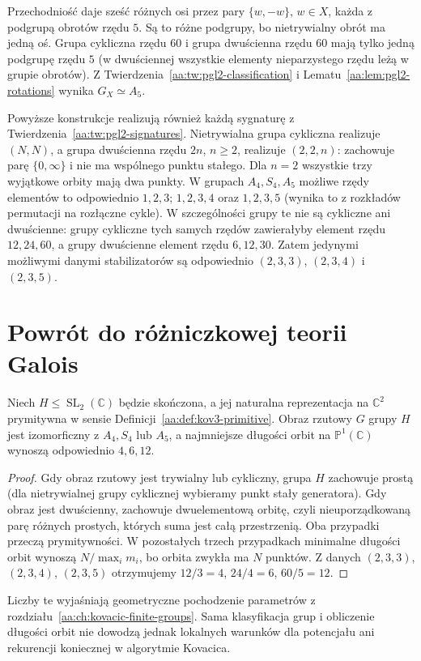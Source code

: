 \begin{przyklad}[Dwudziestościan]
Przechodniość daje sześć różnych osi przez pary
$\{w,-w\}$, $w\in X$, każda z podgrupą obrotów rzędu $5$.
Są to różne podgrupy, bo nietrywialny obrót ma jedną oś.
Grupa cykliczna rzędu $60$ i grupa dwuścienna rzędu $60$
mają tylko jedną podgrupę rzędu $5$ (w dwuściennej
wszystkie elementy nieparzystego rzędu leżą w grupie
obrotów). Z Twierdzenia~\ref{aa:tw:pgl2-classification}
i Lematu~\ref{aa:lem:pgl2-rotations} wynika $G_X\simeq A_5$.
\end{przyklad}

\begin{uwaga}
\label{aa:uw:pgl2-signatures-realized}
Powyższe konstrukcje realizują również każdą sygnaturę
z Twierdzenia~\ref{aa:tw:pgl2-signatures}.
Nietrywialna grupa cykliczna realizuje $(N,N)$,
a grupa dwuścienna rzędu $2n$, $n\ge2$, realizuje
$(2,2,n)$: zachowuje parę $\{0,\infty\}$ i nie ma
wspólnego punktu stałego. Dla $n=2$ wszystkie trzy
wyjątkowe orbity mają dwa punkty.
W grupach $A_4,S_4,A_5$ możliwe rzędy elementów
to odpowiednio $1,2,3$; $1,2,3,4$ oraz $1,2,3,5$
(wynika to z rozkładów permutacji na rozłączne cykle).
W szczególności grupy te nie są cykliczne ani dwuścienne:
grupy cykliczne tych samych rzędów zawierałyby element
rzędu $12,24,60$, a grupy dwuścienne element rzędu
$6,12,30$. Zatem jedynymi możliwymi danymi stabilizatorów
są odpowiednio $(2,3,3)$, $(2,3,4)$ i $(2,3,5)$.
\end{uwaga}

\section{Powrót do różniczkowej teorii Galois}

\begin{wniosek}
\label{aa:wn:pgl2-primitive-orbits}
Niech $H\le\operatorname{SL}_2(\mathbb C)$ będzie skończona,
a jej naturalna reprezentacja na $\mathbb C^2$ prymitywna
w sensie Definicji~\ref{aa:def:kov3-primitive}.
Obraz rzutowy $G$ grupy $H$ jest izomorficzny z $A_4,S_4$
lub $A_5$, a najmniejsze długości orbit na
$\mathbb P^1(\mathbb C)$ wynoszą odpowiednio $4,6,12$.
\end{wniosek}
\begin{proof}
Gdy obraz rzutowy jest trywialny lub cykliczny,
grupa $H$ zachowuje prostą (dla nietrywialnej grupy
cyklicznej wybieramy punkt stały generatora).
Gdy obraz jest dwuścienny, zachowuje dwuelementową
orbitę, czyli nieuporządkowaną parę różnych prostych,
których suma jest całą przestrzenią. Oba przypadki
przeczą prymitywności.
W pozostałych trzech przypadkach minimalne długości
orbit wynoszą $N/\max_i m_i$, bo orbita zwykła ma
$N$ punktów. Z danych $(2,3,3)$, $(2,3,4)$, $(2,3,5)$
otrzymujemy $12/3=4$, $24/4=6$, $60/5=12$.
\end{proof}

Liczby te wyjaśniają geometryczne pochodzenie parametrów
z rozdziału~\ref{aa:ch:kovacic-finite-groups}.
Sama klasyfikacja grup i obliczenie długości orbit
nie dowodzą jednak lokalnych warunków dla potencjału
ani rekurencji koniecznej w algorytmie Kovacica.
